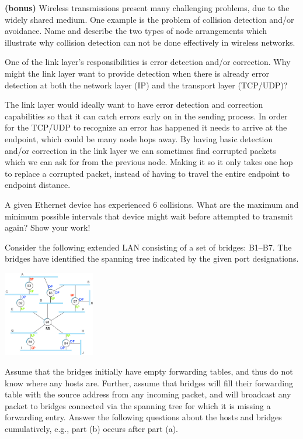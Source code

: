 \documentclass[12pt,addpoints,answers]{exam}
\begin{document}
\begin{questions}

\bonusquestion \textbf{(bonus)} Wireless transmissions present many challenging problems, due to the widely shared medium. One example is the problem of collision detection and/or avoidance. Name and describe the two types of node arrangements which illustrate why collision detection can not be done effectively in wireless networks.
\begin{solution}[10em]
\end{solution}
\vfill

\question[4] One of the link layer's responsibilities is error detection and/or correction. Why might the link layer want to provide detection when there is already error detection at both the network layer (IP) and the transport layer (TCP/UDP)?
\begin{solution}[10em]
	The link layer would ideally want to have error detection and correction capabilities so that it can catch errors early on in the sending process.  In order for the TCP/UDP to recognize an error has happened it needs to arrive at the endpoint, which could be many node hops away.  By having basic detection and/or correction in the link layer we can sometimes find corrupted packets which we can ask for from the previous node.  Making it so it only takes one hop to replace a corrupted packet, instead of having to travel the entire endpoint to endpoint distance.
\end{solution}
\vfill

\question[6] A given Ethernet device has experienced 6 collisions. What are the maximum and minimum possible intervals that device might wait before attempted to transmit again? Show your work!
\begin{solution}[10em]
	
\end{solution}
\vfill

\newpage
\question Consider the following extended LAN consisting of a set of bridges: B1--B7. The bridges have identified the spanning tree indicated by the given port designations.
\begin{center}
\includegraphics[width=0.3\textwidth]{fig/complex-ports.png}
\end{center}
Assume that the bridges initially have empty forwarding tables, and thus do not know where any hosts are. Further, assume that bridges will fill their forwarding table with the source address from any incoming packet, and will broadcast any packet to bridges connected via the spanning tree for which it is missing a forwarding entry. Answer the following questions about the hosts and bridges cumulatively, e.g., part (b) occurs after part (a).
\begin{parts}

\end{parts}
\end{questions}
\end{document}
